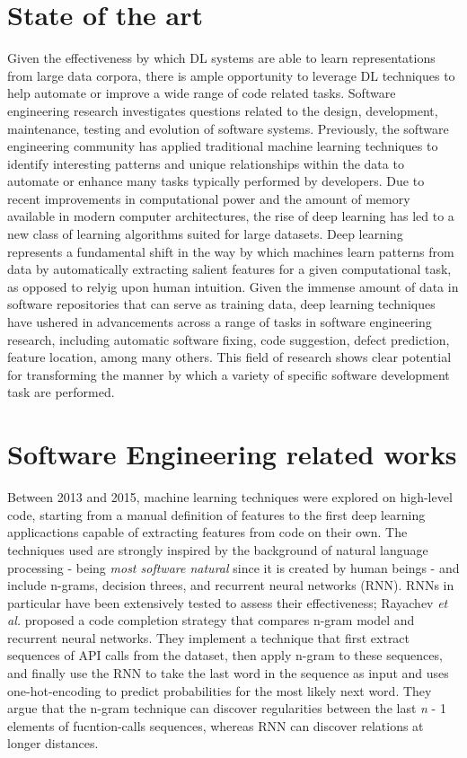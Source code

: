\section{State of the art}
Given the effectiveness by which DL systems are able to learn representations from large data corpora, there is 
ample opportunity to leverage DL techniques to help automate or improve a wide range of code related tasks. 
Software engineering research investigates questions related to the design, development, maintenance, testing and evolution 
of software systems. Previously, the software engineering community has applied traditional machine learning 
techniques to identify interesting patterns and unique relationships within the data to automate or enhance many tasks typically 
performed by developers. Due to recent improvements in computational power and the amount of memory available 
in modern computer architectures, the rise of deep learning has led to a new class of learning algorithms suited for large datasets.
Deep learning represents a fundamental shift in the way by which machines learn patterns from data by automatically extracting salient features
for a given computational task, as opposed to relyig upon human intuition. Given the immense amount of data in software repositories that 
can serve as training data, deep learning techniques have ushered in advancements across a range of tasks in software engineering research, including
automatic software fixing, code suggestion, defect prediction, feature location, among many others. This field of research shows clear potential for
transforming the manner by which a variety of specific software development task are performed.

\section{Software Engineering related works}
Between 2013 and 2015, machine learning techniques were explored on high-level code, starting from a manual 
definition of features to the first deep learning applicactions capable of extracting features from code on their own.
The techniques used are strongly inspired by the background of natural language processing 
- being \textit{most software natural} \cite{hindle2016naturalness} since it is created by human beings - and include n-grams, decision threes, 
and recurrent neural networks (RNN). RNNs in particular have been extensively tested to assess their effectiveness;
Rayachev \textit{et al.} \cite{raychev2014code} proposed a code completion strategy that compares n-gram model and recurrent neural networks. 
They implement a technique that first extract sequences of API calls from the dataset, then apply n-gram to these sequences, and finally use the RNN 
to take the last word in the sequence as input and uses one-hot-encoding to predict probabilities for the most likely next word.
They argue that the n-gram technique can discover regularities between the last \textit{n} - 1 elements of fucntion-calls sequences, whereas RNN can discover
relations at longer distances.


